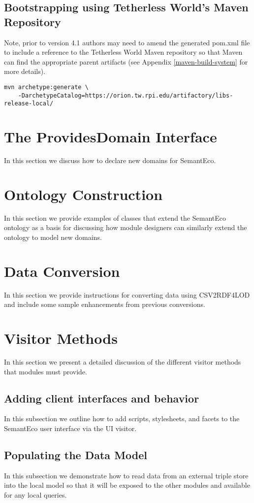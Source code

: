 \documentclass[letterpaper]{report}
\begin{document}
\subsection{Bootstrapping using Tetherless World's Maven Repository}
Note, prior to version 4.1 authors may need to amend the generated pom.xml file to include a reference to the Tetherless World Maven repository so that Maven can find the appropriate parent artifacts (see Appendix \ref{maven-build-system} for more details).
\begin{verbatim}
mvn archetype:generate \
    -DarchetypeCatalog=https://orion.tw.rpi.edu/artifactory/libs-release-local/
\end{verbatim}

\section{The ProvidesDomain Interface}
In this section we discuss how to declare new domains for SemantEco.
\section{Ontology Construction}
In this section we provide examples of classes that extend the SemantEco ontology as a basis for discussing how module designers can similarly extend the ontology to model new domains.
\section{Data Conversion}
In this section we provide instructions for converting data using CSV2RDF4LOD \cite{lebo2011producing} and include some sample enhancements from previous conversions.
\section{Visitor Methods}
\label{visitors}
In this section we present a detailed discussion of the different visitor methods that modules must provide.
\subsection{Adding client interfaces and behavior}
In this subsection we outline how to add scripts, stylesheets, and facets to the SemantEco user interface via the UI visitor.
\subsection{Populating the Data Model}
In this subsection we demonstrate how to read data from an external triple store into the local model so that it will be exposed to the other modules and available for any local queries.
\end{document}
